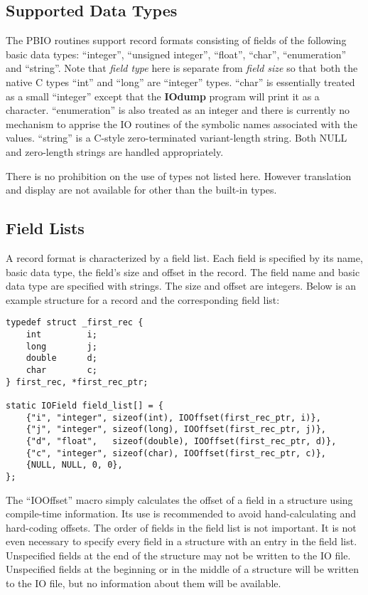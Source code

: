 \documentclass{article}
\begin{document}
\subsection{Supported Data Types\label{sec:datatypes}}

The PBIO routines support record formats consisting of fields of the following
basic data types: ``integer'', ``unsigned integer'', ``float'', ``char'',
``enumeration'' and ``string''.  Note that {\em field type} here is separate
from {\em field size} so that both the native C types ``int'' and ``long'' are
``integer'' types.  ``char'' is essentially treated as a small ``integer''
except that the {\bf IOdump} program will print it as a character.
``enumeration'' is also treated as an integer and there is currently no
mechanism to apprise the IO routines of the symbolic names associated with the
values.  ``string'' is a C-style zero-terminated variant-length string.  Both
NULL and zero-length strings are handled appropriately.  

There is no prohibition on the use of types not listed here.  However
translation and display are not available for other than the built-in types.

\subsection{Field Lists\label{sec:fieldlist}}
A record format is characterized by a field list.  Each field is specified by
its name, basic data type, the field's size and offset in the record.  The
field name and basic data type are specified with strings.  The size and
offset are integers.  Below is an example structure for a record and the
corresponding field list:
\begin{verbatim}
typedef struct _first_rec {
    int         i;
    long        j;
    double      d;
    char        c;
} first_rec, *first_rec_ptr;

static IOField field_list[] = {
    {"i", "integer", sizeof(int), IOOffset(first_rec_ptr, i)},
    {"j", "integer", sizeof(long), IOOffset(first_rec_ptr, j)},
    {"d", "float",   sizeof(double), IOOffset(first_rec_ptr, d)},
    {"c", "integer", sizeof(char), IOOffset(first_rec_ptr, c)},
    {NULL, NULL, 0, 0},
};
\end{verbatim}

The ``IOOffset'' macro simply calculates the offset of a field in a structure
using compile-time information.  Its use is recommended to avoid
hand-calculating and hard-coding offsets.  The order of fields in the field
list is not important.  It is not even necessary to specify every field
in a structure with an entry in the field list. Unspecified fields at the end
of the structure may not be written to the IO file.  Unspecified fields
at the beginning or in the middle of a structure will be written to the IO
file, but no information about them will be available.
\end{document}

